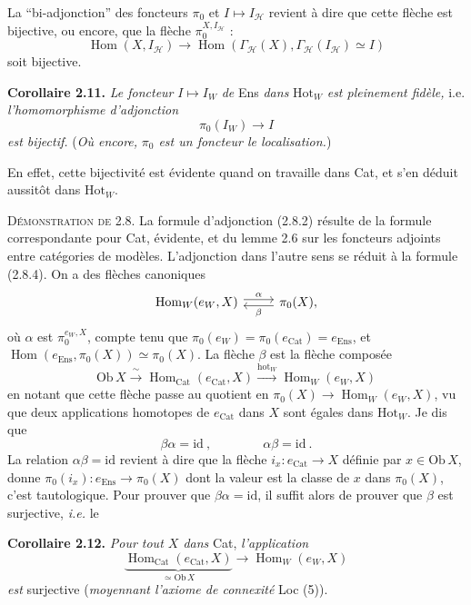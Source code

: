 \documentclass[11pt]{article}
\newcommand{\printedpage}[1]{\marginpar{\footnotesize p.~#1}}
\newcommand{\msp}[1]{\marginpar{\footnotesize [#1]}}
\newcommand{\Cat}{\mathrm{Cat}}
\newcommand{\Ob}{\mathrm{Ob}\,}
\newcommand{\Hom}{\operatorname{Hom}}
\newcommand{\Hot}{\mathrm{Hot}}
\newcommand{\Ens}{\mathrm{Ens}}
\newcommand{\id}{\mathrm{id}}
\begin{document}
La “bi-adjonction” des foncteurs $\pi_0$ et $I\longmapsto I_{\mathcal{H}}$ revient à dire que cette flèche est bijective,
\msp{17}
ou encore, que la flèche $\pi_0^{X,I_{\mathcal{H}}}$ :
\[
\Hom(X,I_{\mathcal{H}})\longrightarrow\Hom(\Gamma_{\mathcal{H}}(X),\Gamma_{\mathcal{H}}(I_{\mathcal{H}})\simeq I)
\]
soit bijective.

\textbf{Corollaire 2.11.} \textit{Le foncteur} $I\longmapsto I_W$ \textit{de} Ens \textit{dans} $\Hot_W$ \textit{est pleinement fidèle,} i.e. \textit{l'homomorphisme d'adjonction}
\[
\pi_0(I_W)\longrightarrow I
\]
\textit{est bijectif.} (\textit{Où encore,} %
\textit{$\pi_0$ est un foncteur le localisation.}) %

En effet, cette bijectivité est évidente quand on travaille dans Cat, et s'en déduit aussitôt dans $\Hot_W$.

\textsc{Démonstration de} 2.8. La formule d'adjonction (2.8.2) résulte de la formule correspondante pour Cat, évidente, et du lemme 2.6 sur les foncteurs adjoints entre catégories de modèles. L'adjonction dans l'autre sens se réduit à la formule (2.8.4). On a des flèches canoniques
\[
\begin{tikzcd}
\Hom_W(e_W,X) \arrow[r,shift left,"\alpha"] & \pi_0(X), \arrow[l,shift left,"\beta"]
\end{tikzcd}
\]
où $\alpha$ est $\pi_0^{e_W,X}$, compte tenu que $\pi_0(e_W)=\pi_0(e_{\Cat})=e_{\Ens}$, et $\Hom(e_{\Ens},\pi_0(X))\simeq\pi_0(X)$. La flèche $\beta$ est la flèche composée
\[
\Ob X\xrightarrow{\ \sim\ }\Hom_{\Cat}(e_{\Cat},X)\xrightarrow{\mathrm{hot}_W}\Hom_W(e_W,X)
\]
\msp{18}
en notant que cette flèche passe au quotient en $\pi_0(X)\longrightarrow\Hom_W(e_W,X)$, vu que deux applications homotopes de $e_{\Cat}$ dans $X$ sont égales dans $\Hot_W$. Je dis que
\[
\beta\alpha=\id\ ,\qquad\qquad \alpha\beta=\id\ .
\]
La relation $\alpha\beta=\id$ revient à dire que la flèche $i_x : e_{\Cat}\longrightarrow X$ définie par $x\in\Ob X$, donne $\pi_0(i_x) : e_{\Ens}\longrightarrow\pi_0(X)$ dont la valeur est la classe de $x$ dans $\pi_0(X)$, c'est tautologique. Pour prouver que $\beta\alpha=\id$, il suffit alors de prouver que $\beta$ est surjective, \textit{i.e.} le

\textbf{Corollaire 2.12.} \textit{Pour tout $X$ dans} Cat, \textit{l'application}
\[
\underbrace{\Hom_{\Cat}(e_{\Cat},X)}_{\simeq\Ob X}\longrightarrow\Hom_W(e_W,X)
\]
\printedpage{10}
\textit{est} surjective (\textit{moyennant l'axiome de connexité} Loc (5)).
\end{document}
